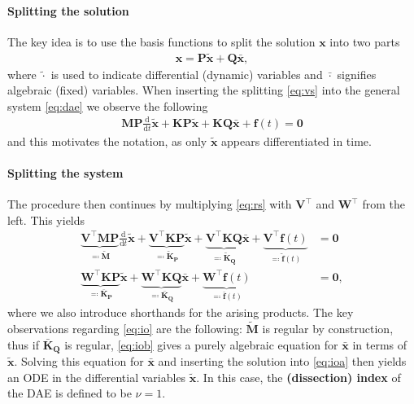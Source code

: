 \documentclass[AMA,STIX1COL]{WileyNJD-v2}
\newcommand{\mb}[1]{\mathbf{#1}}
\newcommand{\mbt}[1]{\tilde{\mathbf{#1}}}
\newcommand{\mbb}[1]{\bar{\mathbf{#1}}}
\newcommand{\T}{{\!\top}}
\newcommand{\ddt}{\frac{\mathrm{d}}{\mathrm{d}t}}
\begin{document}
\paragraph{Splitting the solution}
The key idea is to use the basis functions to split the solution $\mb{x}$ into two parts
\begin{align}
    \mb{x} = \mb{P} \mbt{x} + \mb{Q} \mbb{x} \label{eq:vs},
\end{align}
where $\tilde{\cdot}$ is used to indicate differential (dynamic) variables and $\bar{\cdot}$ signifies algebraic (fixed) variables. When inserting the splitting \eqref{eq:vs} into the general system \eqref{eq:dae} we observe the following
\begin{align}
    \mb{M} \mb{P} \ddt \mbt{x} + \mb{K} \mb{P} \mbt{x} + \mb{K} \mb{Q} \mbb{x} + \mb{f}(t) = \mb{0} \label{eq:rs}
\end{align}
and this motivates the notation, as only $\mbt{x}$ appears differentiated in time.

\paragraph{Splitting the system}
The procedure then continues by multiplying \eqref{eq:rs} with $\mb{V}^{\T}$ and $\mb{W}^{\T}$ from the left. This yields
\begin{subequations}
    \label{eq:io}
    \begin{align}
            \underbrace{\mb{V}^{\T} \mb{M} \mb{P}}_{\eqqcolon \mbt{M}} \ddt \mbt{x} + \underbrace{\mb{V}^{\T} \mb{K} \mb{P}}_{\eqqcolon \mbt{K}_\mb{P}} \mbt{x} + \underbrace{\mb{V}^{\T} \mb{K} \mb{Q}}_{\eqqcolon \mbt{K}_\mb{Q}} \mbb{x} + \underbrace{\mb{V}^{\T} \mb{f}(t)}_{\eqqcolon \mbt{f}(t)} &= \mb{0} \label{eq:ioa}\\
            \underbrace{\mb{W}^{\T} \mb{K} \mb{P}}_{\eqqcolon \mbb{K}_\mb{P}} \mbt{x} + \underbrace{\mb{W}^{\T} \mb{K} \mb{Q}}_{\eqqcolon \mbb{K}_\mb{Q}} \mbb{x} + \underbrace{\mb{W}^{\T} \mb{f}(t)}_{\eqqcolon \mbb{f}(t)} &= \mb{0} \label{eq:iob},
    \end{align}
\end{subequations}
where we also introduce shorthands for the arising products. The key observations regarding \eqref{eq:io} are the following: $\mbt{M}$ is regular by construction, thus if $\mbb{K}_\mb{Q}$ is regular, \eqref{eq:iob} gives a purely algebraic equation for $\mbb{x}$ in terms of $\mbt{x}$. Solving this equation for $\mbb{x}$ and inserting the solution into \eqref{eq:ioa} then yields an ODE in the differential variables $\mbt{x}$. In this case, the \textbf{(dissection) index} of the DAE is defined to be $\nu = 1$.
\end{document}
